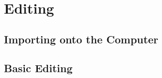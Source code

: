 \documentclass[letterpaper]{latexclasses/tmarticle}
\begin{document}
\section{Editing}

\subsection{Importing onto the Computer}


\begin{itemize}

\end{itemize}

\subsection{Basic Editing}
\end{document}

